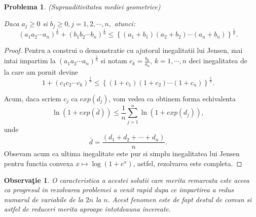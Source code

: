 \documentclass[a4paper,12pt,oneside]{report}
\newtheorem{problem}{Problema}
\newtheorem{remark}{Observa\c{t}ie}
\begin{document}
\begin{problem} (Supraaditivitatea mediei geometrice)
	
Daca \(a_{j}\geq 0 \) si \(b_{j}\geq 0, j = 1 , 2, \cdots, n,\) atunci:
\begin{displaymath}
  \left ( a_{1}a_{2}\cdots a_{n} \right )^{\frac{1}{n}} + \left ( b_{1}b_{2}\cdots b_{n} \right )^{\frac{1}{n}} \leq  \left \{ \left ( a_{1} + b_{1}\right ) \left ( a_{2} + b_{2} \right )\cdots \left ( a_{n} + b_{n} \right )\right \}^{\frac{1}{n}}.
\end{displaymath}
\end{problem}
	\begin{proof}
	Pentru a construi o demonstratie cu ajutorul inegalitatii lui Jensen, mai intai impartim la
\(\left ( a_{1}a_{2}\cdots a_{n} \right )^{\frac{1}{n}}\) si notam \(c_{k}=\frac{b_{k}}{a_{k}},~k=1,\cdots, n\) deci inegalitatea de la care am pornit devine
\begin{displaymath}
  1 + \left ( c_{1}c_{2} \cdots c_{k}\right )^{\frac{1}{n}}\leq \left \{ \left ( 1 + c_{1} \right )\left ( 1 + c_{2} \right )\cdots \left ( 1 + c_{n} \right ) \right \}^{\frac{1}{n}}.
\end{displaymath}

Acum, daca scriem \(c_{j}\) ca \(exp\left (d _{j} \right )\), vom vedea ca obtinem forma echivalenta
\begin{displaymath}
  \ln\left ( 1 + exp\left ( \bar{d} \right ) \right ) \leq \frac{1}{n}\sum_{j = 1}^{n}\ln\left ( 1 + exp\left ( d_{j} \right ) \right ),
\end{displaymath}
unde
\begin{displaymath}
  \bar{d} = \frac{\left ( d_{1} + d_{2}  + \cdots + d_{n}\right )}{n}.
\end{displaymath}
Obsevam acum ca ultima inegalitate este pur si simplu inegalitatea lui Jensen pentru functia convexa \(x \mapsto \log \left ( 1 + e^{x} \right )\), astfel, rezolvarea este completa.
\end{proof}
\begin{remark}
O caracteristica a acestei solutii care merita remarcata este aceea ca progresul in rezolvarea problemei a venit rapid dupa ce impartirea a redus numarul de variabile de la \(2n\) la \(n\). Acest fenomen este de fapt destul de comun si astfel de reduceri merita aproape intotdeauna incercate.
\end{remark}
\end{document}

